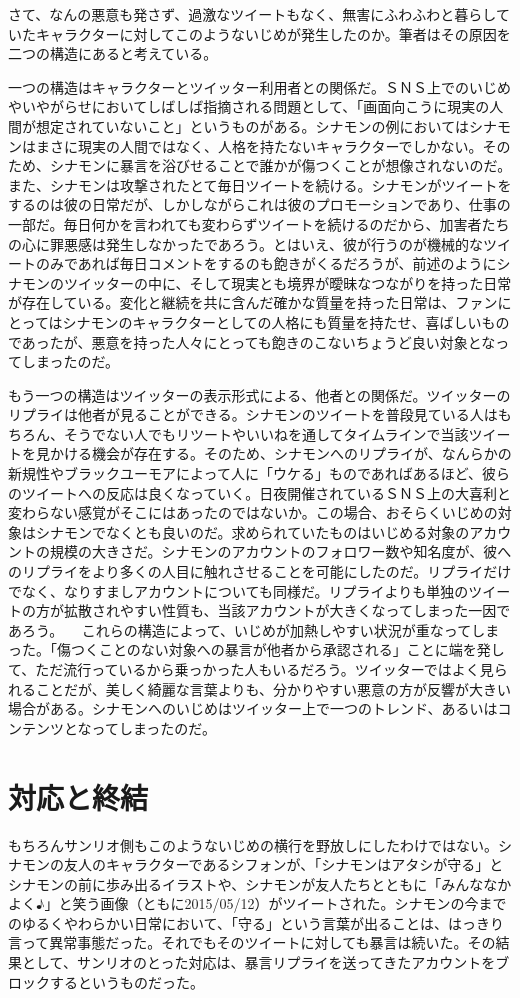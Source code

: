 \documentclass[b5j,twoside,twocolumn]{utarticle}
\begin{document}
さて、なんの悪意も発さず、過激なツイートもなく、無害にふわふわと暮らしていたキャラクターに対してこのようないじめが発生したのか。筆者はその原因を二つの構造にあると考えている。


一つの構造はキャラクターとツイッター利用者との関係だ。ＳＮＳ上でのいじめやいやがらせにおいてしばしば指摘される問題として、「画面向こうに現実の人間が想定されていないこと」というものがある。シナモンの例においてはシナモンはまさに現実の人間ではなく、人格を持たないキャラクターでしかない。そのため、シナモンに暴言を浴びせることで誰かが傷つくことが想像されないのだ。また、シナモンは攻撃されたとて毎日ツイートを続ける。シナモンがツイートをするのは彼の日常だが、しかしながらこれは彼のプロモーションであり、仕事の一部だ。毎日何かを言われても変わらずツイートを続けるのだから、加害者たちの心に罪悪感は発生しなかったであろう。とはいえ、彼が行うのが機械的なツイートのみであれば毎日コメントをするのも飽きがくるだろうが、前述のようにシナモンのツイッターの中に、そして現実とも境界が曖昧なつながりを持った日常が存在している。変化と継続を共に含んだ確かな質量を持った日常は、ファンにとってはシナモンのキャラクターとしての人格にも質量を持たせ、喜ばしいものであったが、悪意を持った人々にとっても飽きのこないちょうど良い対象となってしまったのだ。


もう一つの構造はツイッターの表示形式による、他者との関係だ。ツイッターのリプライは他者が見ることができる。シナモンのツイートを普段見ている人はもちろん、そうでない人でもリツートやいいねを通してタイムラインで当該ツイートを見かける機会が存在する。そのため、シナモンへのリプライが、なんらかの新規性やブラックユーモアによって人に「ウケる」ものであればあるほど、彼らのツイートへの反応は良くなっていく。日夜開催されているＳＮＳ上の大喜利と変わらない感覚がそこにはあったのではないか。この場合、おそらくいじめの対象はシナモンでなくとも良いのだ。求められていたものはいじめる対象のアカウントの規模の大きさだ。シナモンのアカウントのフォロワー数や知名度が、彼へのリプライをより多くの人目に触れさせることを可能にしたのだ。リプライだけでなく、なりすましアカウントについても同様だ。リプライよりも単独のツイートの方が拡散されやすい性質も、当該アカウントが大きくなってしまった一因であろう。
　これらの構造によって、いじめが加熱しやすい状況が重なってしまった。「傷つくことのない対象への暴言が他者から承認される」ことに端を発して、ただ流行っているから乗っかった人もいるだろう。ツイッターではよく見られることだが、美しく綺麗な言葉よりも、分かりやすい悪意の方が反響が大きい場合がある。シナモンへのいじめはツイッター上で一つのトレンド、あるいはコンテンツとなってしまったのだ。


\section{対応と終結}
もちろんサンリオ側もこのようないじめの横行を野放しにしたわけではない。シナモンの友人のキャラクターであるシフォンが、「シナモンはアタシが守る」とシナモンの前に歩み出るイラストや、シナモンが友人たちとともに「みんななかよく♪」と笑う画像（ともに2015/05/12）がツイートされた。シナモンの今までのゆるくやわらかい日常において、「守る」という言葉が出ることは、はっきり言って異常事態だった。それでもそのツイートに対しても暴言は続いた。その結果として、サンリオのとった対応は、暴言リプライを送ってきたアカウントをブロックするというものだった。
\end{document}
